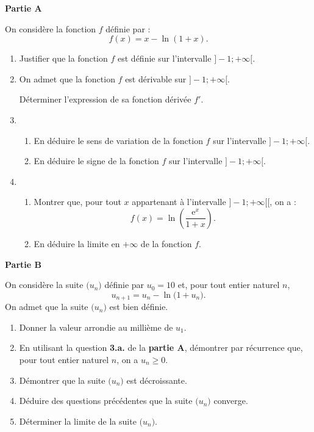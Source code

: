 \textbf{Partie A}

\medskip

On considère la fonction $f$ définie par : \[ f(x)=x-\ln(1+x). \]
%
\begin{enumerate}
	\item Justifier que la fonction $f$ est définie sur l'intervalle $]-1;+\infty[$.
	\item On admet que la fonction $f$ est dérivable sur $]-1;+\infty[$.
	
	Déterminer l'expression de sa fonction dérivée $f'$.
	\item 
	\begin{enumerate}
		\item En déduire le sens de variation de la fonction $f$ sur l'intervalle $]-1;+\infty[$.
		\item En déduire le signe de la fonction $f$ sur l'intervalle $]-1;+\infty[$.
	\end{enumerate}
	\item 
	\begin{enumerate}
		\item Montrer que, pour tout $x$ appartenant à l'intervalle $]-1;+\infty[$[, on a : \[ f(x) = \ln {\left(\frac{\text{e}^x}{1+x}\right)}. \]
		\item En déduire la limite en $+\infty$ de la fonction $f$.
	\end{enumerate}
\end{enumerate}

\medskip

\textbf{Partie B}

\medskip

On considère la suite $\big(u_n\big)$ définie par $u_0=10$ et, pour tout entier naturel $n$, \[ u_{n+1}=u_n-\ln\big(1+u_n\big). \]
%
On admet que la suite $\big(u_n\big)$ est bien définie.

\begin{enumerate}
	\item Donner la valeur arrondie au millième de $u_1$.
	\item En utilisant la question \textbf{3.a.} de la \textbf{partie A}, démontrer par récurrence que, pour tout entier naturel $n$, on a $u_n \geqslant 0$.
	\item Démontrer que la suite $\big(u_n\big)$ est décroissante.
	\item Déduire des questions précédentes que la suite $\big(u_n\big)$ converge.
	\item Déterminer la limite de la suite $\big(u_n\big)$.
\end{enumerate}
